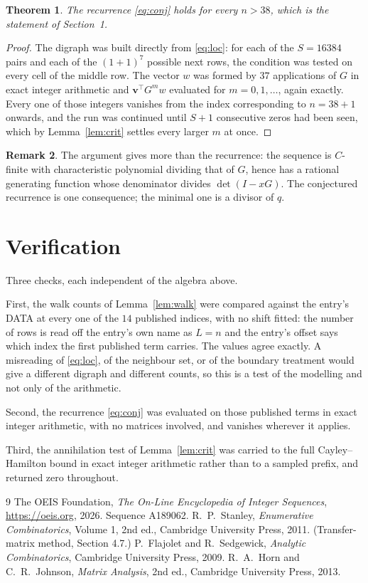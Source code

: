 \documentclass[11pt,a4paper]{article}
\theoremstyle{plain}
\newtheorem{theorem}{Theorem}
\theoremstyle{definition}
\newtheorem{remark}[theorem]{Remark}
\begin{document}
\begin{theorem}
The recurrence \eqref{eq:conj} holds for every $n>38$, which is the statement of
Section~1.
\end{theorem}

\begin{proof}
The digraph was built directly from \eqref{eq:loc}: for each of the $S=16384$ pairs and each
of the $(1+1)^{7}$ possible next rows, the condition was tested on every cell of
the middle row. The vector $w$ was formed by $37$ applications of $G$ in exact integer
arithmetic and $\mathbf{v}^{\!\top}G^{m}w$ evaluated for $m=0,1,\dots$, again exactly.
Every one of those integers vanishes from the index corresponding to $n=38+1$ onwards,
and the run was continued until $S+1$ consecutive zeros had been seen, which by
Lemma~\ref{lem:crit} settles every larger $m$ at once.
\end{proof}

\begin{remark}
The argument gives more than the recurrence: the sequence is $C$-finite with characteristic
polynomial dividing that of $G$, hence has a rational generating function whose denominator
divides $\det(I-xG)$. The conjectured recurrence is one consequence; the minimal one is a
divisor of $q$.
\end{remark}

\section{Verification}

Three checks, each independent of the algebra above.

First, the walk counts of Lemma~\ref{lem:walk} were compared against the entry's DATA at
every one of the $14$ published indices, with no shift fitted: the number of rows is
read off the entry's own name as $L=n$ and the entry's offset says which index the first
published term carries. The values agree exactly. A misreading of \eqref{eq:loc}, of the
neighbour set, or of the boundary treatment would give a different digraph and different
counts, so this is a test of the modelling and not only of the arithmetic.

Second, the recurrence \eqref{eq:conj} was evaluated on those published terms in exact
integer arithmetic, with no matrices involved, and vanishes wherever it applies.

Third, the annihilation test of Lemma~\ref{lem:crit} was carried to the full
Cayley--Hamilton bound in exact integer arithmetic rather than to a sampled prefix, and
returned zero throughout.

\begin{thebibliography}{9}
 The OEIS Foundation, \emph{The On-Line Encyclopedia of Integer
Sequences}, \url{https://oeis.org}, 2026. Sequence A189062.
 R.~P.~Stanley, \emph{Enumerative Combinatorics}, Volume 1, 2nd ed.,
Cambridge University Press, 2011. (Transfer-matrix method, Section 4.7.)
 P.~Flajolet and R.~Sedgewick, \emph{Analytic Combinatorics}, Cambridge
University Press, 2009.
 R.~A.~Horn and C.~R.~Johnson, \emph{Matrix Analysis}, 2nd ed., Cambridge
University Press, 2013.
\end{thebibliography}
\end{document}

